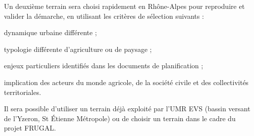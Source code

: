 Un deuxième terrain sera choisi rapidement en Rhône-Alpes pour reproduire
et valider la démarche, en utilisant les critères de sélection suivants :

\startitemize[packed]

\item dynamique urbaine différente ;
\item typologie différente d’agriculture ou de paysage ;
\item enjeux particuliers identifiés dans les documents de planification ;
\item implication des acteurs du monde agricole, de la société civile
  et des collectivités territoriales.

\stopitemize

Il sera possible d'utiliser un terrain déjà exploité par l'UMR EVS (bassin versant de l'Yzeron,
St Étienne Métropole) ou de choisir un terrain dans le cadre du projet FRUGAL.